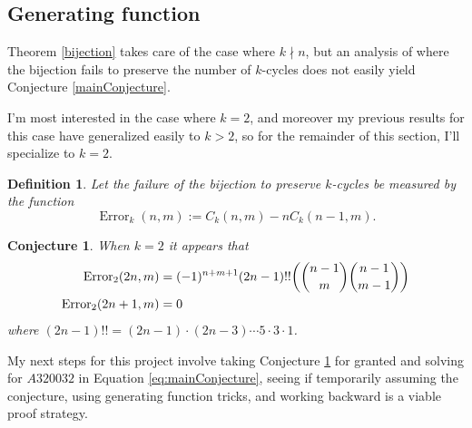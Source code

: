\documentclass{article}
\let\originalleft\left
\let\originalright\right
\renewcommand{\left}{\mathopen{}\mathclose\bgroup\originalleft}
\renewcommand{\right}{\aftergroup\egroup\originalright}
\numberwithin{equation}{subsection}
\newtheorem{definition}[theo]{Definition}
\newtheorem{conjecture}[theo]{Conjecture}
\begin{document}
\subsection{Generating function}
Theorem \ref{bijection} takes care of the case where $k \nmid n$, but an
analysis of where the bijection fails to preserve the number of $k$-cycles does
not easily yield Conjecture \ref{mainConjecture}.

I'm most interested in the case where $k = 2$, and moreover my previous results
for this case have generalized easily to $k > 2$, so for the remainder of this
section, I'll specialize to $k = 2$.

\begin{definition}
  Let the failure of the bijection to preserve $k$-cycles be measured by the
  function \begin{equation}
    \operatorname{Error}_k(n,m) := C_k(n,m) - nC_k(n-1,m).
  \end{equation}
\end{definition}

\begin{conjecture}
  \label{errorConjecture}
  When $k = 2$ it appears that \begin{align}
    \operatorname{Error}_2(2n,m) &= (-1)^{n + m + 1}(2n - 1)!!\left(\binom{n-1}{m}\binom{n-1}{m-1}\right) \\
    \operatorname{Error}_2(2n + 1,m) &= 0
  \end{align}
  where $(2n-1)!! = (2n-1) \cdot (2n-3) \cdots 5 \cdot 3 \cdot 1$.
\end{conjecture}

My next steps for this project involve taking Conjecture \ref{errorConjecture}
for granted and solving for $A320032$ in Equation \ref{eq:mainConjecture}, seeing
if temporarily assuming the conjecture, using generating function tricks,
and working backward is a viable proof strategy.
\end{document}

